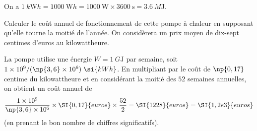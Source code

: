 \begin{corrige}
On a $\SI{1}{k\watt h}=\SI{1000}{\watt h}=\SI{1000}{\watt}\times\SI{3600}{\second}=\SI{3,6}{M\joule}$.
\end{corrige}




\begin{enonce}
	Calculer le coût annuel de fonctionnement de cette pompe à chaleur en supposant qu'elle tourne la moitié de l'année. On considèrera un prix moyen de dix-sept centimes d'euros au kilowattheure.
	
\end{enonce}


\begin{corrige}
La pompe utilise une énergie $W=\SI{1}{G\joule}$ par semaine, soit $1\times10^9/(\np{3,6}\times10^6)\;\si{kWh}$. En multipliant par le coût de $\np{0,17}$ centime du kilowattheure et en considérant la moitié des $52$ semaines annuelles, on obtient un coût annuel de  
\[
\frac{1\times10^9}{\np{3,6}\times10^6}
\times\SI{0,17}{euros}\times \frac{52}{2} = 
\SI{1228}{euros}=\SI{1,2e3}{euros}
\]
 (en prenant le bon nombre de chiffres significatifs).
\end{corrige}


\finEntrainement








\hauteurLargeurCadreReponse		{8mm}{4.5cm}
\typeEntrainement				{} %
\initialisationEntrainement


